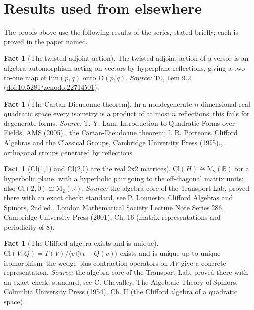 \documentclass[11pt]{article}
\theoremstyle{definition}
\newtheorem{fact}[theorem]{Fact}
\theoremstyle{plain}
\providecommand{\Cl}{}\renewcommand{\Cl}{\mathrm{Cl}}
\providecommand{\Mat}{}\renewcommand{\Mat}{\mathrm{M}}
\providecommand{\Pin}{}\renewcommand{\Pin}{\mathrm{Pin}}
\providecommand{\R}{}\renewcommand{\R}{\mathbb{R}}
\begin{document}
\section{Results used from elsewhere}
The proofs above use the following results of the series, stated briefly; each is proved in the paper named.

\begin{fact}[The twisted adjoint action]\label{c:primer.twisted-adjoint-action}
The twisted adjoint action of a versor is an algebra automorphism acting on vectors by hyperplane reflections, giving a two-to-one map of $\Pin(p,q)$ onto $\mathrm{O}(p,q)$.
\emph{Source:} T0, Lem 9.2 (\href{https://doi.org/10.5281/zenodo.22714501}{doi:10.5281/zenodo.22714501}).
\end{fact}

\begin{fact}[The Cartan-Dieudonne theorem]\label{c:std-algebra.cartan-dieudonne}
In a nondegenerate $n$-dimensional real quadratic space every isometry is a product of at most $n$ reflections; this fails for degenerate forms.
\emph{Source:} T. Y. Lam, Introduction to Quadratic Forms over Fields, AMS (2005)., the Cartan-Dieudonne theorem; I. R. Porteous, Clifford Algebras and the Classical Groups, Cambridge University Press (1995)., orthogonal groups generated by reflections.
\end{fact}

\begin{fact}[Cl(1,1) and Cl(2,0) are the real 2x2 matrices]\label{c:std-algebra.cl11-matrix}
$\Cl(H) \cong \Mat_2(\R)$ for a hyperbolic plane, with a hyperbolic pair going to the off-diagonal matrix units; also $\Cl(2,0) \cong \Mat_2(\R)$.
\emph{Source:} the algebra core of the Transport Lab, proved there with an exact check; standard, see P. Lounesto, Clifford Algebras and Spinors, 2nd ed., London Mathematical Society Lecture Note Series 286, Cambridge University Press (2001), Ch. 16 (matrix representations and periodicity of 8).
\end{fact}

\begin{fact}[The Clifford algebra exists and is unique]\label{c:std-algebra.existence-uniqueness}
$\Cl(V, Q) = T(V)/\langle v \otimes v - Q(v) \rangle$ exists and is unique up to unique isomorphism; the wedge-plus-contraction operators on $\Lambda V$ give a concrete representation.
\emph{Source:} the algebra core of the Transport Lab, proved there with an exact check; standard, see C. Chevalley, The Algebraic Theory of Spinors, Columbia University Press (1954), Ch. II (the Clifford algebra of a quadratic space).
\end{fact}
\end{document}
